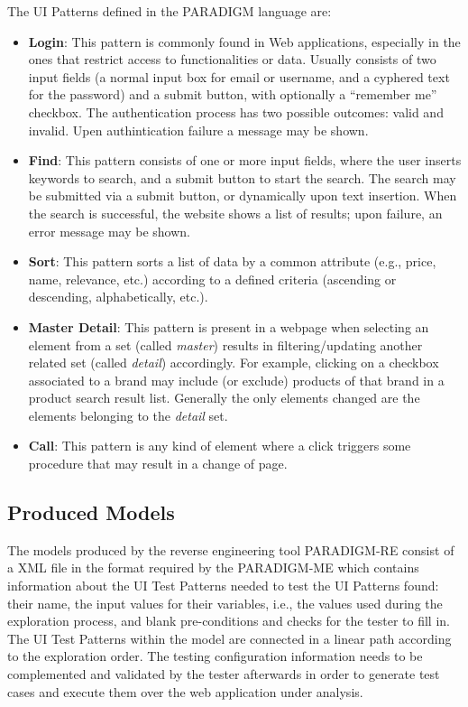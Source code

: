 \documentclass[conference]{IEEEtran}
\begin{document}
The UI Patterns defined in the PARADIGM language are:
\begin{itemize}
\item \textbf{Login}: This pattern is commonly found in Web applications, especially in the ones that restrict access to functionalities or data. Usually consists of two input fields (a normal input box for email or username, and a cyphered text for the password) and a submit button, with optionally a ``remember me'' checkbox. The authentication process has two possible outcomes: valid and invalid. Upen authintication failure a message may be shown. 
\item \textbf{Find}: This pattern consists of one or more input fields, where the user inserts keywords to search, and a submit button to start the search. The search may be submitted via a submit button, or dynamically upon text insertion. When the search is successful, the website shows a list of results; upon failure, an error message may be shown.
\item \textbf{Sort}: This pattern sorts a list of data by a common attribute (e.g., price, name, relevance, etc.) according to a defined criteria (ascending or descending, alphabetically, etc.).
\item \textbf{Master Detail}: This pattern is present in a webpage when selecting an element from a set (called \textit{master}) results in filtering/updating another related set (called \textit{detail}) accordingly. For example, clicking on a checkbox associated to a brand may include (or exclude) products of that brand in a product search result list. Generally the only elements changed are the elements belonging to the \textit{detail} set.
\item \textbf{Call}: This pattern is any kind of element where a click triggers some procedure that may result in a change of page.
\end{itemize}

\subsection{Produced Models}

The models produced by the reverse engineering tool PARADIGM-RE consist of a XML file in the format required by the PARADIGM-ME which contains information about the UI Test Patterns needed to test the UI Patterns found: their name, the input values for their variables, i.e., the values used during the exploration process, and blank pre-conditions and checks for the tester to fill in. The UI Test Patterns within the model are connected in a linear path according to the exploration order. The testing configuration information needs to be complemented and validated by the tester afterwards in order to generate test cases and execute them over the web application under analysis.
\end{document}
